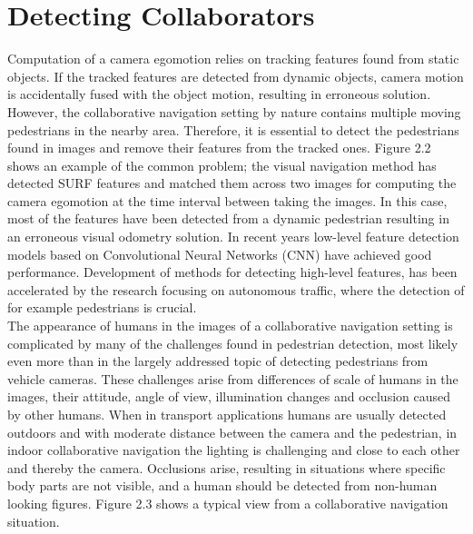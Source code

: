 \section{Detecting Collaborators} 
Computation of a camera egomotion relies on tracking
features found from static objects. If the tracked features
are detected from dynamic objects, camera motion is accidentally fused with the object motion, resulting in erroneous
solution. However, the collaborative navigation setting by nature contains multiple moving pedestrians in the nearby
area. Therefore, it is essential to detect the pedestrians found
in images and remove their features from the tracked ones.
Figure 2.2 shows an example of the common problem; the
visual navigation method has detected SURF features and
matched them across two images for computing the camera
egomotion at the time interval between taking the images.
In this case, most of the features have been detected from a
dynamic pedestrian resulting in an erroneous visual odometry
solution. In recent years low-level feature detection models
based on Convolutional Neural Networks (CNN) have
achieved good performance. Development of methods
for detecting high-level features, has been accelerated by the
research focusing on autonomous traffic, where the detection
of for example pedestrians is crucial.\\
The appearance of humans in the images of a collaborative
navigation setting is complicated by many of the challenges
found in pedestrian detection, most likely even more than
in the largely addressed topic of detecting pedestrians from
vehicle cameras. These challenges arise from differences of
scale of humans in the images, their attitude, angle of view,
illumination changes and occlusion caused by other humans.
When in transport applications humans are usually detected
outdoors and with moderate distance between the camera and
the pedestrian, in indoor collaborative navigation the lighting
is challenging and close to each other and thereby the camera.
Occlusions arise, resulting in situations where specific body
parts are not visible, and a human should be detected from
non-human looking figures. Figure 2.3 shows a typical view
from a collaborative navigation situation.\\
